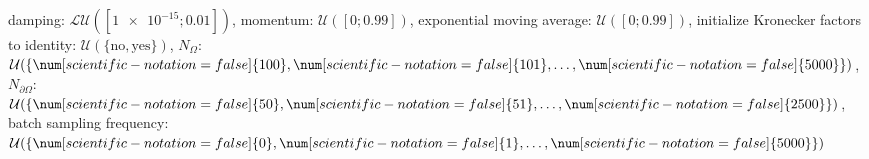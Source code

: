damping: $\mathcal{LU}([\num[scientific-notation=true]{1e-15}; \num[scientific-notation=true]{0.01}])$, momentum: $\mathcal{U}([\num[scientific-notation=false]{0}; \num[scientific-notation=true]{0.99}])$, exponential moving average: $\mathcal{U}([\num[scientific-notation=false]{0}; \num[scientific-notation=true]{0.99}])$, initialize Kronecker factors to identity: $\mathcal{U}(\{\text{no},\text{yes}\})$, $N_{\Omega}$: $\mathcal{U}(\{\num[scientific-notation=false]{100},\num[scientific-notation=false]{101},\text{\dots},\num[scientific-notation=false]{5000}\})$, $N_{\partial\Omega}$: $\mathcal{U}(\{\num[scientific-notation=false]{50},\num[scientific-notation=false]{51},\text{\dots},\num[scientific-notation=false]{2500}\})$, batch sampling frequency: $\mathcal{U}(\{\num[scientific-notation=false]{0},\num[scientific-notation=false]{1},\text{\dots},\num[scientific-notation=false]{5000}\})$